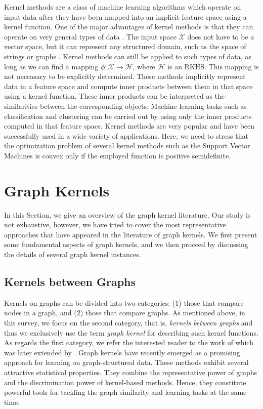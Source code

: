 \documentclass[twoside,11pt]{article}
\begin{document}
Kernel methods are a class of machine learning algorithms which operate on input data after they have been mapped into an implicit feature space using a kernel function.
One of the major advantages of kernel methods is that they can operate on very general types of data .
The input space $\mathcal{X}$ does not have to be a vector space, but it can represent any structured domain, such as the space of strings or graphs .
Kernel methods can still be applied to such types of data, as long as we can find a mapping $\phi : \mathcal{X} \rightarrow \mathcal{H}$, where $\mathcal{H}$ is an RKHS.
This mapping is not neccasary to be explicitly determined. 
These methods implicitly represent data in a feature space and compute inner products between them in that space using a kernel function.
These inner products can be interpreted as the similarities between the corresponding objects.
Machine learning tasks such as classification and clustering can be carried out by using only the inner products computed in that feature space.
Kernel methods are very popular and have been successfully used in a wide variety of applications.
Here, we need to stress that the optimization problem of several kernel methods such as the Support Vector Machines is convex only if the employed function is positive semidefinite.








\section{Graph Kernels}\label{sec:graph_kernels}
In this Section, we give an overview of the graph kernel literature.
Our study is not exhaustive, however, we have tried to cover the most representative approaches that have appeared in the literature of graph kernels.
We first present some fundamental aspects of graph kernels, and we then proceed by discussing the details of several graph kernel instances.

\subsection{Kernels between Graphs}
Kernels on graphs can be divided into two categories: ($1$) those that compare nodes in a graph, and ($2$) those that compare graphs.
As mentioned above, in this survey, we focus on the second category, that is, \textit{kernels between graphs} and thus we exclusively use the term \textit{graph kernel }for describing such kernel functions.
As regards the first category, we refer the interested reader to the work of  which was later extended by .
Graph kernels have recently emerged as a promising approach for learning on graph-structured data.
These methods exhibit several attractive statistical properties.
They combine the representative power of graphs and the discrimination power of kernel-based methods.
Hence, they constitute powerful tools for tackling the graph similarity and learning tasks at the same time.
\end{document}
